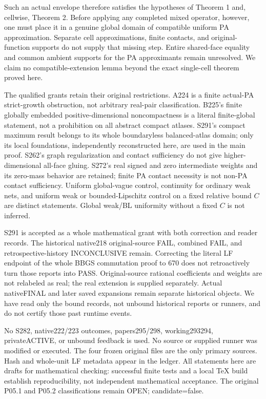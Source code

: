 \documentclass[
  11pt,
]{article}
\begin{document}
Such an actual envelope therefore satisfies the hypotheses of Theorem 1
and, cellwise, Theorem 2. Before applying any completed mixed operator,
however, one must place it in a genuine global domain of compatible
uniform PA approximation. Separate cell approximations, finite contacts,
and original-function supports do not supply that missing step. Entire
shared-face equality and common ambient supports for the PA approximants
remain unresolved. We claim no compatible-extension lemma beyond the
exact single-cell theorem proved here.

The qualified grants retain their original restrictions. A224 is a
finite actual-PA strict-growth obstruction, not arbitrary real-pair
classification. B225's finite globally embedded positive-dimensional
noncompactness is a literal finite-global statement, not a prohibition
on all abstract compact atlases. S291's compact maximum result belongs
to its whole boundaryless balanced-atlas domain; only its local
foundations, independently reconstructed here, are used in the main
proof. S262's graph regularization and contact sufficiency do not give
higher-dimensional all-face gluing. S272's real signed and zero
intermediate weights and its zero-mass behavior are retained; finite PA
contact necessity is not non-PA contact sufficiency. Uniform
global-vague control, continuity for ordinary weak nets, and uniform
weak or bounded-Lipschitz control on a fixed relative bound \(C\) are
distinct statements. Global weak/BL uniformity without a fixed \(C\) is
not inferred.

S291 is accepted as a whole mathematical grant with both correction and
reader records. The historical native218 original-source FAIL, combined
FAIL, and retrospective-history INCONCLUSIVE remain. Correcting the
literal LF endpoint of the whole BBGS commutation proof to 670 does not
retroactively turn those reports into PASS. Original-source rational
coefficients and weights are not relabeled as real; the real extension
is supplied separately. Actual nativeFINAL and later saved expansions
remain separate historical objects. We have read only the bound records,
not unbound historical reports or runners, and do not certify those past
runtime events.

No S282, native222/223 outcomes, papers295/298, working293294,
privateACTIVE, or unbound feedback is used. No source or supplied runner
was modified or executed. The four frozen original files are the only
primary sources. Hash and whole-unit LF metadata appear in the ledger.
All statements here are drafts for mathematical checking: successful
finite tests and a local TeX build establish reproducibility, not
independent mathematical acceptance. The original P05.1 and P05.2
classifications remain OPEN; candidate=false.
\end{document}
